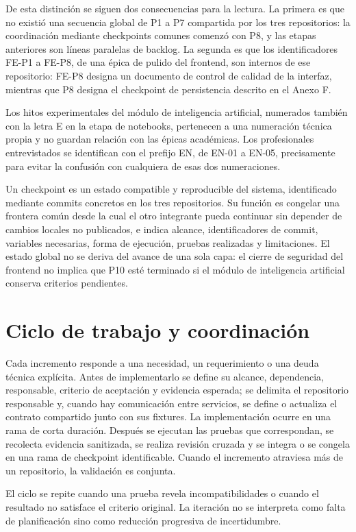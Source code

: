 De esta distinción se siguen dos consecuencias para la lectura. La primera es que no existió una secuencia global de P1 a P7 compartida por los tres repositorios: la coordinación mediante checkpoints comunes comenzó con P8, y las etapas anteriores son líneas paralelas de backlog. La segunda es que los identificadores FE-P1 a FE-P8, de una épica de pulido del frontend, son internos de ese repositorio: FE-P8 designa un documento de control de calidad de la interfaz, mientras que P8 designa el checkpoint de persistencia descrito en el Anexo F.

Los hitos experimentales del módulo de inteligencia artificial, numerados también con la letra E en la etapa de notebooks, pertenecen a una numeración técnica propia y no guardan relación con las épicas académicas. Los profesionales entrevistados se identifican con el prefijo EN, de EN-01 a EN-05, precisamente para evitar la confusión con cualquiera de esas dos numeraciones.

Un checkpoint es un estado compatible y reproducible del sistema, identificado mediante commits concretos en los tres repositorios. Su función es congelar una frontera común desde la cual el otro integrante pueda continuar sin depender de cambios locales no publicados, e indica alcance, identificadores de commit, variables necesarias, forma de ejecución, pruebas realizadas y limitaciones. El estado global no se deriva del avance de una sola capa: el cierre de seguridad del frontend no implica que P10 esté terminado si el módulo de inteligencia artificial conserva criterios pendientes.

\section{Ciclo de trabajo y coordinación}

Cada incremento responde a una necesidad, un requerimiento o una deuda técnica explícita. Antes de implementarlo se define su alcance, dependencia, responsable, criterio de aceptación y evidencia esperada; se delimita el repositorio responsable y, cuando hay comunicación entre servicios, se define o actualiza el contrato compartido junto con sus fixtures. La implementación ocurre en una rama de corta duración. Después se ejecutan las pruebas que correspondan, se recolecta evidencia sanitizada, se realiza revisión cruzada y se integra o se congela en una rama de checkpoint identificable. Cuando el incremento atraviesa más de un repositorio, la validación es conjunta.

El ciclo se repite cuando una prueba revela incompatibilidades o cuando el resultado no satisface el criterio original. La iteración no se interpreta como falta de planificación sino como reducción progresiva de incertidumbre.

